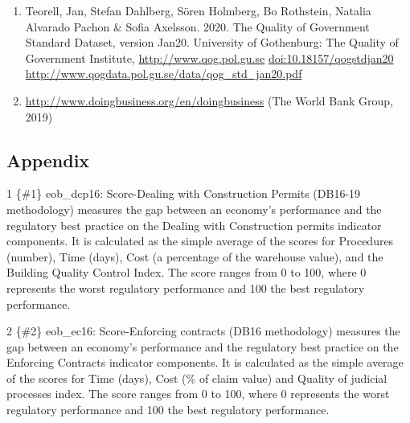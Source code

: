 \documentclass[
]{article}
\providecommand{\tightlist}{%
  \setlength{\itemsep}{0pt}\setlength{\parskip}{0pt}}
\begin{document}
\begin{enumerate}
\def\labelenumi{\roman{enumi})}
\tightlist
\item
  Teorell, Jan, Stefan Dahlberg, Sören Holmberg, Bo Rothstein, Natalia
  Alvarado Pachon \& Sofia Axelsson. 2020. The Quality of Government
  Standard Dataset, version Jan20. University of Gothenburg: The Quality
  of Government Institute, \url{http://www.qog.pol.gu.se}
  \url{doi:10.18157/qogstdjan20}
  \url{http://www.qogdata.pol.gu.se/data/qog_std_jan20.pdf}
\item
  \url{http://www.doingbusiness.org/en/doingbusiness} (The World Bank
  Group, 2019)
\end{enumerate}

\hypertarget{appendix}{%
\subsection{Appendix}\label{appendix}}

1 \{\#1\} eob\_dcp16: Score-Dealing with Construction Permits (DB16-19
methodology) measures the gap between an economy's performance and the
regulatory best practice on the Dealing with Construction permits
indicator components. It is calculated as the simple average of the
scores for Procedures (number), Time (days), Cost (a percentage of the
warehouse value), and the Building Quality Control Index. The score
ranges from 0 to 100, where 0 represents the worst regulatory
performance and 100 the best regulatory performance.

2 \{\#2\} eob\_ec16: Score-Enforcing contracts (DB16 methodology)
measures the gap between an economy's performance and the regulatory
best practice on the Enforcing Contracts indicator components. It is
calculated as the simple average of the scores for Time (days), Cost (\%
of claim value) and Quality of judicial processes index. The score
ranges from 0 to 100, where 0 represents the worst regulatory
performance and 100 the best regulatory performance.
\end{document}
